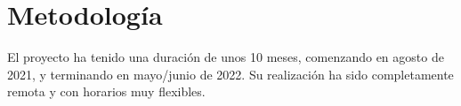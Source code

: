 \section{Metodología}

El proyecto ha tenido una duración de unos 10 meses, comenzando en agosto de
2021, y terminando en mayo/junio de 2022. Su realización ha sido completamente
remota y con horarios muy flexibles.

